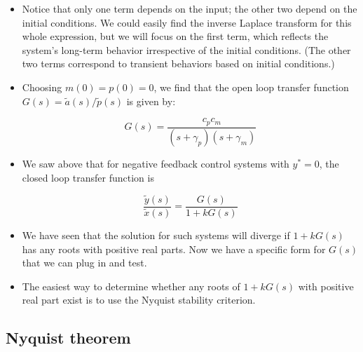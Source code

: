 \documentclass{article}
\begin{document}
\begin{itemize}
\item Notice that only one term depends on the input; the other two depend on the initial conditions. We could easily find the inverse Laplace transform for this whole expression, but we will focus on the first term, which reflects the system's long-term behavior irrespective of the initial conditions. (The other two terms correspond to transient behaviors based on initial conditions.)

\item Choosing $m(0)=p(0)=0$, we find that the open loop transfer function $G(s)=\tilde{a}(s)/\tilde{p}(s)$ is given by:

\[ G(s) = \frac{c_p c_m}{\left( s + \gamma_p \right)\left( s + \gamma_m \right)} \]

\item We saw above that for negative feedback control systems with $y^*=0$, the closed loop transfer function is

\[ \frac{\tilde{y}(s)}{\tilde{x}(s)}  = \frac{G(s)}{1 + kG(s)}  \]

\item We have seen that the solution for such systems will diverge if $1 + kG(s)$ has any roots with positive real parts. Now we have a specific form for $G(s)$ that we can plug in and test.

\item The easiest way to determine whether any roots of $1 + kG(s)$ with positive real part exist is to use the Nyquist stability criterion.
\end{itemize}

\subsection*{Nyquist theorem}
\end{document}
